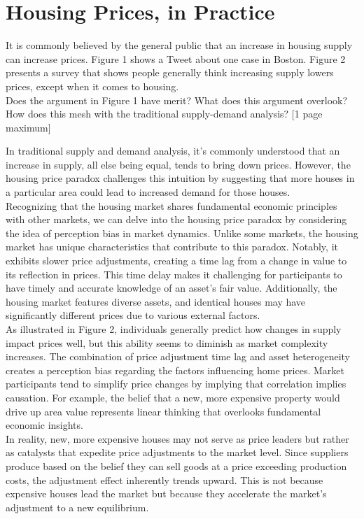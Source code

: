 \section{Housing Prices, in Practice}

\begin{tcolorbox}
    It is commonly believed by the general public that an increase in housing supply can increase prices.
    Figure 1 shows a Tweet about one case in Boston. Figure 2 presents a survey that shows people
    generally think increasing supply lowers prices, except when it comes to housing.\\

    Does the argument in Figure 1 have merit? What does this argument overlook? How does this
    mesh with the traditional supply-demand analysis? [1 page maximum]
\end{tcolorbox}

In traditional supply and demand analysis, it's commonly understood that an increase in supply, all else being equal, tends to bring down prices. However, the housing price paradox challenges this intuition by suggesting that more houses in a particular area could lead to increased demand for those houses.\\

Recognizing that the housing market shares fundamental economic principles with other markets, we can delve into the housing price paradox by considering the idea of perception bias in market dynamics. Unlike some markets, the housing market has unique characteristics that contribute to this paradox. Notably, it exhibits slower price adjustments, creating a time lag from a change in value to its reflection in prices. This time delay makes it challenging for participants to have timely and accurate knowledge of an asset's fair value. Additionally, the housing market features diverse assets, and identical houses may have significantly different prices due to various external factors.\\

As illustrated in Figure 2, individuals generally predict how changes in supply impact prices well, but this ability seems to diminish as market complexity increases. The combination of price adjustment time lag and asset heterogeneity creates a perception bias regarding the factors influencing home prices. Market participants tend to simplify price changes by implying that correlation implies causation. For example, the belief that a new, more expensive property would drive up area value represents linear thinking that overlooks fundamental economic insights.\\

In reality, new, more expensive houses may not serve as price leaders but rather as catalysts that expedite price adjustments to the market level. Since suppliers produce based on the belief they can sell goods at a price exceeding production costs, the adjustment effect inherently trends upward. This is not because expensive houses lead the market but because they accelerate the market's adjustment to a new equilibrium.\\
